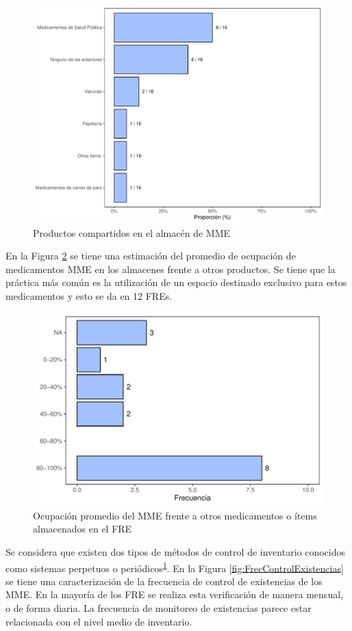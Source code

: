 \documentclass[
]{book}
\begin{document}
\begin{figure}
\includegraphics[width=0.85\linewidth]{InformeFinal_files/figure-latex/ProductosCompartidos1-1} \caption{Productos compartidos en el almacén de MME}\label{fig:ProductosCompartidos1}
\end{figure}

En la Figura \ref{fig:PropOcupacionAlmacen} se tiene una estimación del promedio de ocupación de medicamentos MME en los almacenes frente a otros productos. Se tiene que la práctica más común es la utilización de un espacio destinado exclusivo para estos medicamentos y esto se da en 12 FREs.

\begin{figure}
\includegraphics[width=0.85\linewidth]{InformeFinal_files/figure-latex/PropOcupacionAlmacen-1} \caption{Ocupación promedio del MME frente a otros medicamentos o ítems almacenados en el FRE}\label{fig:PropOcupacionAlmacen}
\end{figure}

Se considera que existen dos tipos de métodos de control de inventario conocidos como sistemas perpetuos o periódicos\textsuperscript{\protect\hyperlink{ref-Silver2017}{1}}.
En la Figura \ref{fig:FrecControlExistencias} se tiene una caracterización de la frecuencia de control de existencias de los MME. En la mayoría de los FRE se realiza esta verificación de manera mensual, o de forma diaria. La frecuencia de monitoreo de existencias parece estar relacionada con el nivel medio de inventario.
\end{document}
